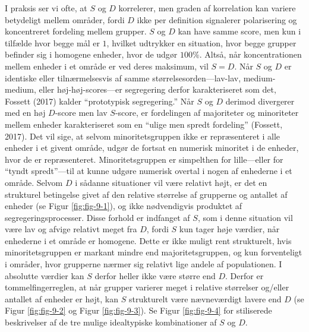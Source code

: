 \documentclass[
]{book}
\begin{document}
I praksis ser vi ofte, at \(S\) og \(D\) korrelerer, men graden af korrelation kan variere betydeligt mellem områder, fordi \(D\) ikke per definition signalerer polarisering og koncentreret fordeling mellem grupper. \(S\) og \(D\) kan have samme score, men kun i tilfælde hvor begge mål er \(1\), hvilket udtrykker en situation, hvor begge grupper befinder sig i homogene enheder, hvor de udgør \(100\%\). Altså, når koncentrationen mellem enheder i et område er ved deres maksimum, vil \(S=D\). Når \(S\) og \(D\) er identiske eller tilnærmelsesvis af samme størrelsesorden---lav-lav, medium-medium, eller høj-høj-scores---er segregering derfor karakteriseret som det, Fossett (2017) kalder ``prototypisk segregering.'' Når \(S\) og \(D\) derimod divergerer med en høj \(D\)-score men lav \(S\)-score, er fordelingen af majoriteter og minoriteter mellem enheder karakteriseret som en ``ulige men spredt fordeling'' (Fossett, 2017). Det vil sige, at selvom minoritetsgruppen ikke er repræsenteret i alle enheder i et givent område, udgør de fortsat en numerisk minoritet i de enheder, hvor de er repræsenteret. Minoritetsgruppen er simpelthen for lille---eller for ``tyndt spredt''---til at kunne udgøre numerisk overtal i nogen af enhederne i et område. Selvom \(D\) i sådanne situationer vil være relativt højt, er det en strukturel betingelse givet af den relative størrelse af grupperne og antallet af enheder (se Figur \ref{fig:fig-9-1}), og ikke nødvendigvis produktet af segregeringsprocesser. Disse forhold er indfanget af \(S\), som i denne situation vil være lav og afvige relativt meget fra \(D\), fordi \(S\) kun tager høje værdier, når enhederne i et område er homogene. Dette er ikke muligt rent strukturelt, hvis minoritetsgruppen er markant mindre end majoritetsgruppen, og kun forventeligt i områder, hvor grupperne nærmer sig relativt lige andele af populationen. I absolutte værdier kan \(S\) derfor heller ikke være større end \(D\). Derfor er tommelfingerreglen, at når grupper varierer meget i relative størrelser og/eller antallet af enheder er højt, kan \(S\) strukturelt være nævneværdigt lavere end \(D\) (se Figur \ref{fig:fig-9-2} og Figur \ref{fig:fig-9-3}). Se Figur \ref{fig:fig-9-4} for stiliserede beskrivelser af de tre mulige idealtypiske kombinationer af \(S\) og \(D\).
\end{document}
